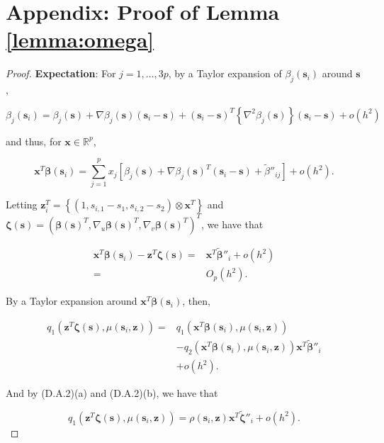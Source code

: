 \documentclass[authoryear,review, 12pt]{elsarticle}
\begin{document}
\section*{Appendix: Proof of Lemma \ref{lemma:omega}}
\begin{proof}
\textbf{Expectation}: For $j=1,\dots,3p$, by a Taylor expansion of
$\beta_{j}\left(\bm{s}_{i}\right)$ around $\bm{s}$,

\[
\beta_{j}\left(\bm{s}_{i}\right)=\beta_{j}\left(\bm{s}\right)+\nabla\beta_{j}\left(\bm{s}\right)\left(\bm{s}_{i}-\bm{s}\right)+\left(\bm{s}_{i}-\bm{s}\right)^{T}\left\{ \nabla^{2}\beta_{j}\left(\bm{s}\right)\right\} \left(\bm{s}_{i}-\bm{s}\right)+o\left(h^{2}\right)
\]


and thus, for $\bm{x}\in\mathbb{R}^{p}$, 

\[
\bm{x}^{T}\bm{\beta}\left(\bm{s}_{i}\right)=\sum_{j=1}^{p}x_{j}\left[\beta_{j}\left(\bm{s}\right)+\nabla\beta_{j}\left(\bm{s}\right)^{T}\left(\bm{s}_{i}-\bm{s}\right)+\tilde{\beta}''_{ij}\right]+o\left(h^{2}\right).
\]


Letting $\bm{z}_{i}^{T}=\left\{ \left(1,s_{i,1}-s_{1},s_{i,2}-s_{2}\right)\otimes\bm{x}^{T}\right\} $
and $\bm{\zeta}\left(\bm{s}\right)=\left(\bm{\beta}\left(\bm{s}\right)^{T},\nabla_{u}\bm{\beta}\left(\bm{s}\right)^{T},\nabla_{v}\bm{\beta}\left(\bm{s}\right)^{T}\right)^{T}$,
we have that 

\begin{align*}
\bm{x}^{T}\bm{\beta}\left(\bm{s}_{i}\right)-\bm{z}^{T}\bm{\zeta}\left(\bm{s}\right)= & \bm{x}^{T}\tilde{\bm{\beta}}''_{i}+o\left(h^{2}\right)\\
= & O_{p}\left(h^{2}\right).
\end{align*}


By a Taylor expansion around $\bm{x}^{T}\bm{\beta}\left(\bm{s}_{i}\right)$,
then, 

\begin{align*}
q_{1}\left(\bm{z}^{T}\bm{\zeta}\left(\bm{s}\right),\mu\left(\bm{s}_{i},\bm{z}\right)\right)= & q_{1}\left(\bm{x}^{T}\bm{\beta}\left(\bm{s}_{i}\right),\mu\left(\bm{s}_{i},\bm{z}\right)\right)\\
 & -q_{2}\left(\bm{x}^{T}\bm{\beta}\left(\bm{s}_{i}\right),\mu\left(\bm{s}_{i},\bm{z}\right)\right)\bm{x}^{T}\tilde{\bm{\beta}}''_{i}\\
 & +o\left(h^{2}\right).
\end{align*}


And by (D.A.2)(a) and (D.A.2)(b), we have that

\[
q_{1}\left(\bm{z}^{T}\bm{\zeta}\left(\bm{s}\right),\mu\left(\bm{s}_{i},\bm{z}\right)\right)=\rho\left(\bm{s}_{i},\bm{z}\right)\bm{x}^{T}\tilde{\bm{\zeta}}''_{i}+o\left(h^{2}\right).
\]



\end{proof}
\end{document}

